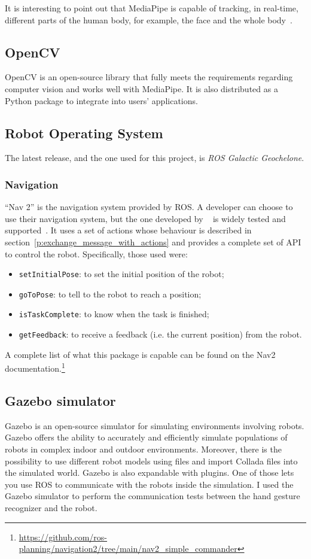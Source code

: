 \documentclass[../thesis.tex]{subfiles}
\begin{document}
It is interesting to point out that MediaPipe is capable of tracking, in real-time, different parts of the human body, for example, the face and the whole body~\cite{site:mediapipe}.

\subsection{OpenCV}
OpenCV is an open-source library that fully meets the requirements regarding computer vision and works well with MediaPipe. It is also distributed as a Python package to integrate into users' applications. 

\subsection{Robot Operating System}
The latest release, and the one used for this project, is \textit{ROS Galactic Geochelone}.

\subsubsection{Navigation}
``Nav 2'' is the navigation system provided by \gls{ROS}. A developer can choose to use their navigation system, but the one developed by ~\citeauthor{paper:navigation2} is widely tested and supported~\cite{paper:navigation2}. It uses a set of actions whose behaviour is described in section~\ref{p:exchange_message_with_actions} and provides a complete set of API to control the robot. Specifically, those used were:
\begin{itemize}
    \item \texttt{setInitialPose}: to set the initial position of the robot;
    \item \texttt{goToPose}: to tell to the robot to reach a position;
    \item \texttt{isTaskComplete}: to know when the task is finished;
    \item \texttt{getFeedback}: to receive a feedback (i.e. the current position) from the robot.
\end{itemize}
A complete list of what this package is capable can be found on the Nav2 documentation.\footnote{ \href{https://github.com/ros-planning/navigation2/tree/main/nav2_simple_commander}{https://github.com/ros-planning/navigation2/tree/main/nav2\_simple\_commander}}

\subsection{Gazebo simulator}
Gazebo is an open-source simulator for simulating environments involving robots. Gazebo offers the ability to accurately and efficiently simulate populations of robots in complex indoor and outdoor environments. Moreover, there is the possibility to use different robot models using   files and import Collada files into the simulated world. Gazebo is also expandable with plugins. One of those lets you use \acrshort{ROS} to communicate with the robots inside the simulation. I used the Gazebo simulator to perform the communication tests between the hand gesture recognizer and the robot.  
\end{document}
